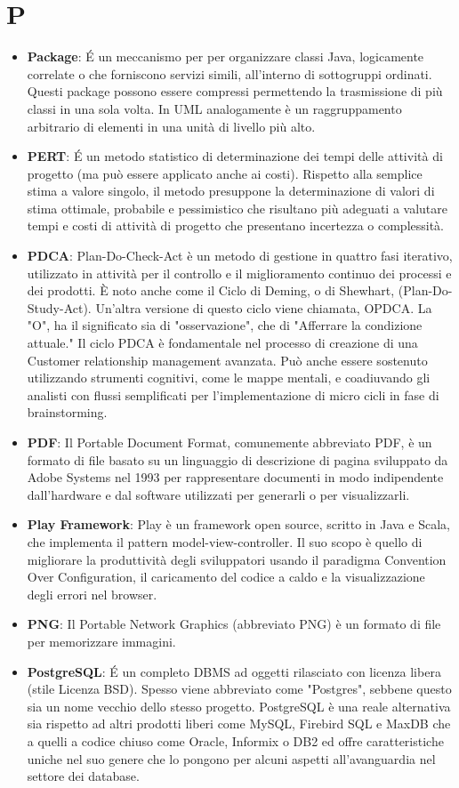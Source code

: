 \section{P}
\begin{itemize} 
	\item
	\textbf{Package}: É un meccanismo per per organizzare classi Java, logicamente correlate o che forniscono servizi simili, all’interno di sottogruppi ordinati. Questi package possono essere compressi permettendo la trasmissione di più classi in una sola volta.
	In UML analogamente è un raggruppamento arbitrario di elementi in una unità di livello più alto.
	\item
	\textbf{PERT}: É un metodo statistico di determinazione dei tempi delle attività di progetto (ma può essere applicato anche ai costi). Rispetto alla semplice stima a valore singolo, il metodo presuppone la determinazione di valori di stima ottimale, probabile e pessimistico che risultano più adeguati a valutare tempi e costi di attività di progetto che presentano incertezza o complessità.
	\item
	\textbf{PDCA}: Plan-Do-Check-Act è un metodo di gestione in quattro fasi iterativo, utilizzato in attività per il controllo e il miglioramento continuo dei processi e dei prodotti. È noto anche come il Ciclo di Deming, o di Shewhart, (Plan-Do-Study-Act). Un'altra versione di questo ciclo viene chiamata, OPDCA. La "O", ha il significato sia di "osservazione", che di "Afferrare la condizione attuale." Il ciclo PDCA è fondamentale nel processo di creazione di una Customer relationship management avanzata. Può anche essere sostenuto utilizzando strumenti cognitivi, come le mappe mentali, e coadiuvando gli analisti con flussi semplificati per l'implementazione di micro cicli in fase di brainstorming.
	\item
	\textbf{PDF}: Il Portable Document Format, comunemente abbreviato PDF, è un formato di file basato su un linguaggio di descrizione di pagina sviluppato da Adobe Systems nel 1993 per rappresentare documenti in modo indipendente dall’hardware e dal software utilizzati per generarli o per visualizzarli.
	\item
	\textbf{Play Framework}: Play è un framework open source, scritto in Java e Scala, che implementa il pattern model-view-controller. Il suo scopo è quello di migliorare la produttività degli sviluppatori usando il paradigma Convention Over Configuration, il caricamento del codice a caldo e la visualizzazione degli errori nel browser.
	\item
	\textbf{PNG}: Il Portable Network Graphics (abbreviato PNG) è un formato di file per memorizzare immagini.
	\item
	\textbf{PostgreSQL}: É un completo DBMS ad oggetti rilasciato con licenza libera (stile Licenza BSD). Spesso viene abbreviato come "Postgres", sebbene questo sia un nome vecchio dello stesso progetto.
	PostgreSQL è una reale alternativa sia rispetto ad altri prodotti liberi come MySQL, Firebird SQL e MaxDB che a quelli a codice chiuso come Oracle, Informix o DB2 ed offre caratteristiche uniche nel suo genere che lo pongono per alcuni aspetti all'avanguardia nel settore dei database.
\end{itemize}


